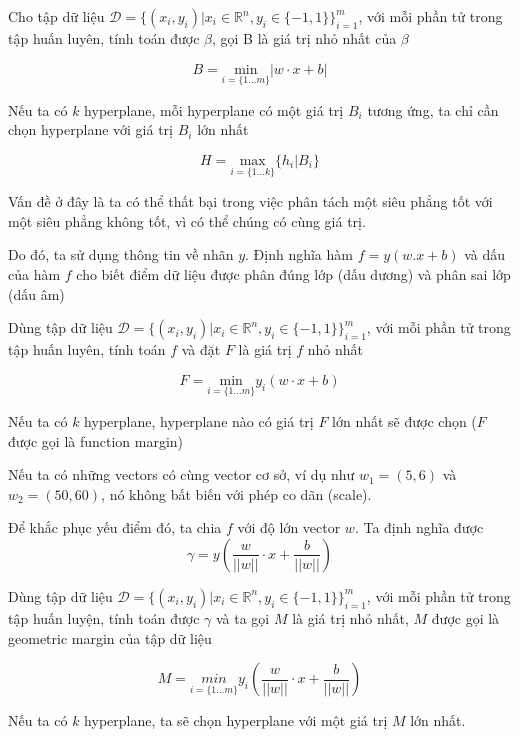 \documentclass{article}
\begin{document}
	Cho tập dữ liệu $\mathcal{D} = \{(x_i, y_i) | x_i \in \mathbb{R}^n, y_i \in \{-1, 1\}\}_{i=1}^m$, với mỗi phần tử trong tập huấn luyên, tính toán được $\beta$, gọi B là giá trị nhỏ nhất của $\beta$
	
	$$B = \underset{i = \{1...m\}}{\text{ min }}|w\cdot x+b|$$
	
	Nếu ta có $k$ hyperplane, mỗi hyperplane có một giá trị $B_i$ tương ứng, ta chỉ cần chọn hyperplane với giá trị $B_i$ lớn nhất
	
	$$H = \underset{i = \{1...k\}}{\text{ max }}\{h_i | B_i\}$$
	
	Vấn đề ở đây là ta có thể thất bại trong việc phân tách một siêu phẳng tốt với một siêu phẳng không tốt, vì có thể chúng có cùng giá trị.
	
	Do đó, ta sử dụng thông tin về nhãn $y$. Định nghĩa hàm $f = y(w.x + b)$ và dấu của hàm $f$ cho biết điểm dữ liệu được phân đúng lớp (dấu dương) và phân sai lớp (dấu âm)
	
	Dùng tập dữ liệu $\mathcal{D} = \{(x_i, y_i) | x_i \in \mathbb{R}^n, y_i \in \{-1, 1\}\}_{i=1}^m$, với mỗi phần tử trong tập huấn luyên, tính toán $f$ và đặt $F$ là giá trị $f$ nhỏ nhất
	
	$$F = \underset{i = \{1...m\}}{\text{ min }}y_i(w \cdot x+b)$$
	
	Nếu ta có $k$ hyperplane, hyperplane nào có giá trị $F$ lớn nhất sẽ được chọn ($F$ được gọi là function margin)
	
	Nếu ta có những vectors có cùng vector cơ sở, ví dụ như $w_1 = (5, 6)$ và $w_2 = (50, 60)$, nó không bất biến với phép co dãn (scale).
	
	Để khắc phục yếu điểm đó, ta chia $f$ với độ lớn vector $w$. Ta định nghĩa được $$\gamma = y\left(\frac{w}{||w||}\cdot x +\frac{b}{||w||} \right)$$
	
	Dùng tập dữ liệu $\mathcal{D} = \{(x_i, y_i) | x_i \in \mathbb{R}^n, y_i \in \{-1, 1\}\}_{i=1}^m$, với mỗi phần tử trong tập huấn luyện, tính toán được $\gamma$ và ta gọi $M$ là giá trị nhỏ nhất, $M$ được gọi là geometric margin của tập dữ liệu
	
	$$
	M = \underset{i = \{1...m\}}{min}y_i\left(\frac{w}{||w||} \cdot x +\frac{b}{||w||} \right)
	$$
	
	Nếu ta có $k$ hyperplane, ta sẽ chọn hyperplane với một giá trị $M$ lớn nhất. 
	
\end{document}
